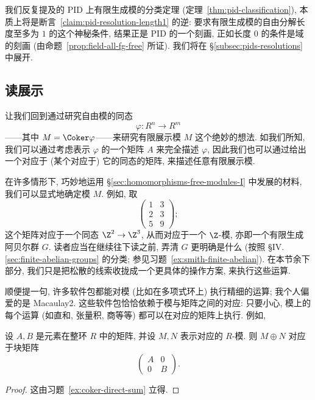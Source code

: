 我们反复提及的 PID 上有限生成模的分类定理 (定理~\ref{thm:pid-classification}), 本质上将是断言~\ref{claim:pid-resolution-length1} 的逆: 要求有限生成模的自由分解长度至多为 $1$ 的这个神秘条件, 结果正是 PID 的一个刻画, 正如长度 $0$ 的条件是域的刻画 (由命题~\ref{prop:field-all-fg-free} 所证). 我们将在 §\ref{subsec:pids-resolutions} 中展开.

\subsection{读展示}\label{subsec:reading-presentation}

让我们回到通过研究自由模的同态
\begin{equation}\varphi:R^n\longrightarrow R^m\tag{*}\end{equation}
——其中 $M=\Coker\varphi$——来研究有限展示模 $M$ 这个绝妙的想法. 如我们所知, 我们可以通过考虑表示 $\varphi$ 的一个矩阵 $A$ 来完全描述 $\varphi$, 因此我们也可以通过给出一个对应于 (某个对应于) 它的同态的矩阵, 来描述任意有限展示模.

在许多情形下, 巧妙地运用 §\ref{sec:homomorphisms-free-modules-I} 中发展的材料, 我们可以显式地确定模 $M$. 例如, 取
$$
\begin{pmatrix} 1 & 3 \\ 2 & 3 \\ 5 & 9 \end{pmatrix};
$$
这个矩阵对应于一个同态 $\Z^2\to\Z^3$, 从而对应于一个 $\Z$-模, 亦即一个有限生成阿贝尔群 $G$. 读者应当在继续往下读之前, 弄清 $G$ 更明确是什么 (按照 §IV.\ref{sec:finite-abelian-groups} 的分类; 参见习题~\ref{ex:smith-finite-abelian}). 在本节余下部分, 我们只是把松散的线索收拢成一个更具体的操作方案, 来执行这些运算.

顺便提一句, 许多软件包都能对模 (比如在多项式环上) 执行精细的运算; 我个人偏爱的是 Macaulay2. 这些软件包恰恰依赖于模与矩阵之间的对应: 只要小心, 模上的每个运算 (如直和, 张量积, 商等等) 都可以在对应的矩阵上执行. 例如,

\begin{lemma}\label{lem:block-direct-sum-module}
设 $A,B$ 是元素在整环 $R$ 中的矩阵, 并设 $M,N$ 表示对应的 $R$-模. 则 $M\oplus N$ 对应于块矩阵
$$
\begin{pmatrix} A & 0 \\ \hline 0 & B \end{pmatrix}.
$$
\end{lemma}

\begin{proof}
这由习题~\ref{ex:coker-direct-sum} 立得.
\end{proof}


